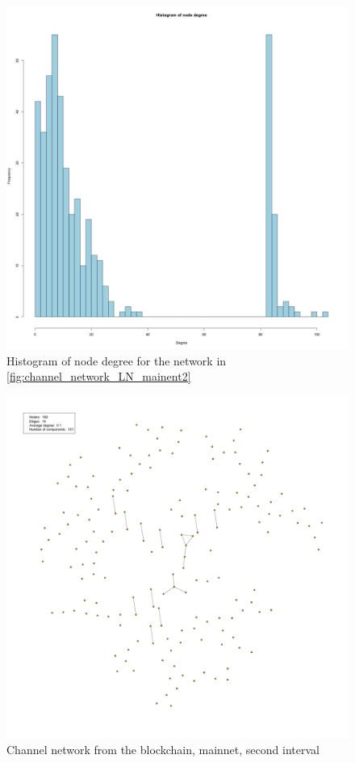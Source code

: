 \begin{figure}[H]
    \centering
    \includegraphics[width=16cm]{figures/graphs/histogram_ln_mainnet_run2.png}
    \caption{Histogram of node degree for the network in \cref{fig:channel_network_LN_mainent2}}
    \label{fig:histogram}
\end{figure}

\begin{figure}[H]
    \centering
    \includegraphics[width=14cm]{figures/graphs/cg_bc_mainnet_run2.png}
    \caption{Channel network from the blockchain, mainnet, second interval}
    \label{fig:channel_network_BC_mainnet}
\end{figure}


